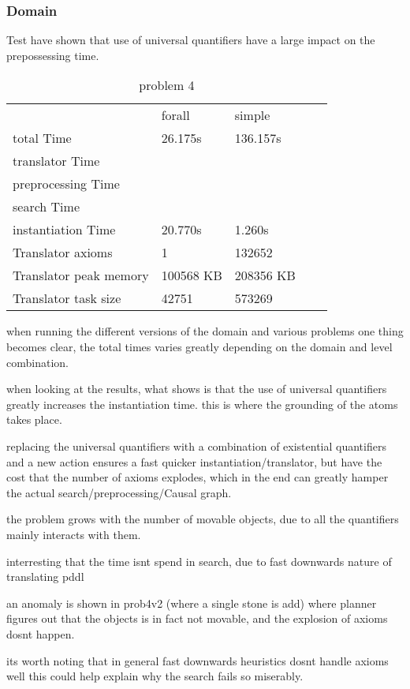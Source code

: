 	\subsubsection{Domain}
	Test have shown that use of universal quantifiers have a large impact on the prepossessing time. 
	\begin{table}
		\centering
		\caption{problem 4}
		\label{prob4}
		\begin{tabular}{lllll}
			 & forall & simple  \\
			total Time& 26.175s & 136.157s \\
			translator Time&  &  \\
			preprocessing Time&  &  \\
			search Time&  &  \\
			instantiation Time &20.770s  &1.260s \\
			Translator axioms & 1 & 132652 \\ 
			Translator peak memory & 100568 KB & 208356 KB\\ 
			Translator task size & 42751 & 573269\\
		\end{tabular}
	\end{table}

	when running the different versions of the domain and various problems one thing becomes clear, the total times varies greatly depending on the domain and level combination.

	when looking at the results, what shows is that the use of universal quantifiers greatly increases the instantiation time. 
	this is where the grounding of the atoms takes place.
	

	replacing the universal quantifiers with a combination of existential quantifiers and a new action ensures a fast quicker instantiation/translator, but have the cost that the number of axioms explodes, which in the end can greatly hamper the actual search/preprocessing/Causal graph.
	
	the problem grows with the number of movable objects, due to all the quantifiers mainly interacts with them.
	
	
	interresting that the time isnt spend in search, due to fast downwards nature of translating pddl
	
	an anomaly is shown in prob4v2 (where a single stone is add) where planner figures out that the objects is in fact not movable, and the explosion of axioms dosnt happen.
	
	its worth noting that in general fast downwards heuristics dosnt handle axioms well %
	this could help explain why the search fails so miserably. 


